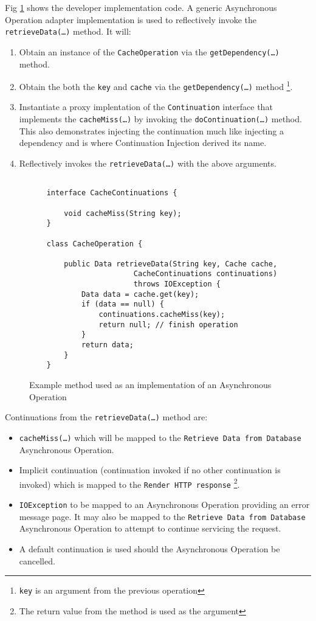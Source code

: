 \documentclass{article}
\begin{document}
Fig \ref{fig:Example_Method_Operation} shows the developer implementation code. 
A generic Asynchronous Operation adapter implementation is used to reflectively invoke
the \texttt{retrieveData(\ldots)} method. It will:
\begin{enumerate}
  \item Obtain an instance of the \texttt{CacheOperation} via the \texttt{getDependency(\ldots)} method.
  \item Obtain the both the \texttt{key} and \texttt{cache} via the \texttt{getDependency(\ldots)} method \footnote{\texttt{key} is an argument from the previous operation}.
  \item Instantiate a proxy implentation of the \texttt{Continuation} interface that implements the \texttt{cacheMiss(\ldots)} by invoking the \texttt{doContinuation(\ldots)} method.  This also demonstrates injecting the continuation much like injecting a dependency and is where Continuation Injection derived its name. 
  \item Reflectively invokes the \texttt{retrieveData(\ldots)} with the above arguments.
\end{enumerate}

\begin{figure}[!h]
\begin{verbatim}

    interface CacheContinuations {

        void cacheMiss(String key);
    }

    class CacheOperation {
    
        public Data retrieveData(String key, Cache cache, 
                        CacheContinuations continuations)
                        throws IOException {
        	Data data = cache.get(key);
        	if (data == null) {
        	    continuations.cacheMiss(key);
        	    return null; // finish operation
        	}
        	return data;
        }
    }
\end{verbatim}
\caption[Caption for Code]{Example method used as an implementation of an Asynchronous Operation}
\label{fig:Example_Method_Operation}
\end{figure}

Continuations from the \texttt{retrieveData(\ldots)} method are:
\begin{itemize}
  \item \texttt{cacheMiss(\ldots)} which will be mapped to the \texttt{Retrieve Data from Database} Asynchronous Operation.
  \item Implicit continuation (continuation invoked if no other continuation is invoked) which is mapped to the \texttt{Render HTTP response} \footnote{The return value from the method is used as the argument}.
  \item \texttt{IOException} to be mapped to an Asynchronous Operation providing an error message page.  It may also be mapped to the \texttt{Retrieve Data from Database} Asynchronous Operation to attempt to continue servicing the request.
  \item A default continuation is used should the Asynchronous Operation be cancelled.
\end{itemize}
\end{document}
